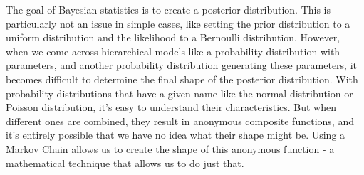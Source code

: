 \documentclass{ltjsbook}
\begin{document}
The goal of Bayesian statistics is to create a posterior distribution. This is particularly not an issue in simple cases, like setting the prior distribution to a uniform distribution and the likelihood to a Bernoulli distribution. However, when we come across hierarchical models like a probability distribution with parameters, and another probability distribution generating these parameters, it becomes difficult to determine the final shape of the posterior distribution. With probability distributions that have a given name like the normal distribution or Poisson distribution, it's easy to understand their characteristics. But when different ones are combined, they result in anonymous composite functions, and it's entirely possible that we have no idea what their shape might be. Using a Markov Chain allows us to create the shape of this anonymous function - a mathematical technique that allows us to do just that.
\end{document}
